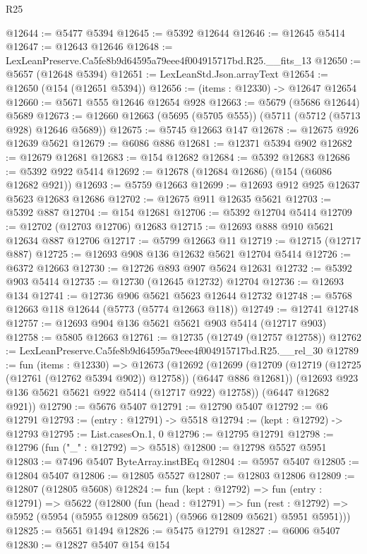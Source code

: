 \begin{lexlean}{R25}
\begin{coremodule}
@12644 := @5477 @5394
@12645 := @5392 @12644
@12646 := @12645 @5414
@12647 := @12643 @12646
@12648 := LexLeanPreserve.Ca5fe8b9d64595a79eee4f004915717bd.R25.__fits_13
@12650 := @5657 (@12648 @5394)
@12651 := LexLeanStd.Json.arrayText
@12654 := @12650 (@154 (@12651 @5394))
@12656 := (items : @12330) -> @12647 @12654
@12660 := @5671 @555 @12646 @12654 @928
@12663 := @5679 (@5686 @12644) @5689
@12673 := @12660 @12663 (@5695 (@5705 @555)) (@5711 (@5712 (@5713 @928) @12646 @5689))
@12675 := @5745 @12663 @147
@12678 := @12675 @926 @12639 @5621
@12679 := @6086 @886
@12681 := @12371 @5394 @902
@12682 := @12679 @12681
@12683 := @154 @12682
@12684 := @5392 @12683
@12686 := @5392 @922 @5414
@12692 := @12678 (@12684 @12686) (@154 (@6086 @12682 @921))
@12693 := @5759 @12663
@12699 := @12693 @912 @925 @12637 @5623 @12683 @12686
@12702 := @12675 @911 @12635 @5621
@12703 := @5392 @887
@12704 := @154 @12681
@12706 := @5392 @12704 @5414
@12709 := @12702 (@12703 @12706) @12683
@12715 := @12693 @888 @910 @5621 @12634 @887 @12706
@12717 := @5799 @12663 @11
@12719 := @12715 (@12717 @887)
@12725 := @12693 @908 @136 @12632 @5621 @12704 @5414
@12726 := @6372 @12663
@12730 := @12726 @893 @907 @5624 @12631
@12732 := @5392 @903 @5414
@12735 := @12730 (@12645 @12732) @12704
@12736 := @12693 @134
@12741 := @12736 @906 @5621 @5623 @12644 @12732
@12748 := @5768 @12663 @118 @12644 (@5773 (@5774 @12663 @118))
@12749 := @12741 @12748
@12757 := @12693 @904 @136 @5621 @5621 @903 @5414 (@12717 @903)
@12758 := @5805 @12663
@12761 := @12735 (@12749 (@12757 @12758))
@12762 := LexLeanPreserve.Ca5fe8b9d64595a79eee4f004915717bd.R25.__rel_30
@12789 := fun (items : @12330) =>
  @12673
    (@12692
      (@12699
        (@12709 (@12719 (@12725 (@12761 (@12762 @5394 @902)) @12758)) (@6447 @886 @12681))
        (@12693 @923 @136 @5621 @5621 @922 @5414 (@12717 @922) @12758))
      (@6447 @12682 @921))
@12790 := @5676 @5407
@12791 := @12790 @5407
@12792 := @6 @12791
@12793 := (entry : @12791) -> @5518
@12794 := (kept : @12792) -> @12793
@12795 := List.casesOn.{1, 0}
@12796 := @12795 @12791
@12798 := @12796 (fun ("_" : @12792) => @5518)
@12800 := @12798 @5527 @5951
@12803 := @7496 @5407 ByteArray.instBEq
@12804 := @5957 @5407
@12805 := @12804 @5407
@12806 := @12805 @5527
@12807 := @12803 @12806
@12809 := @12807 (@12805 @5608)
@12824 := fun (kept : @12792) =>
  fun (entry : @12791) =>
  @5622
    (@12800
      (fun (head : @12791) =>
      fun (rest : @12792) => @5952 (@5954 (@5955 @12809 @5621) (@5966 @12809 @5621) @5951 @5951)))
@12825 := @5651 @1494
@12826 := @5475 @12791
@12827 := @6006 @5407
@12830 := @12827 @5407 @154 @154

\end{coremodule}
\end{lexlean}
